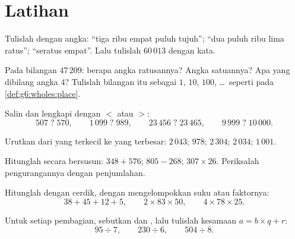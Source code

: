 \section{Latihan}

\begin{exercise}[$\star$]\label{exo:g6:wholes:1}
Tulislah dengan angka: ``tiga ribu empat puluh tujuh''; ``dua puluh
ribu lima ratus''; ``seratus empat''. Lalu tulislah $60\,013$ dengan kata.
\end{exercise}

\begin{exercise}[$\star$]\label{exo:g6:wholes:2}
Pada bilangan $47\,209$: berapa angka ratusannya? Angka satuannya?
Apa yang dibilang angka $4$? Tulislah bilangan itu sebagai 
 $1$, $10$, $100$, \dots\ seperti pada
\cref{def:g6:wholes:place}.
\end{exercise}

\begin{exercise}[$\star$]\label{exo:g6:wholes:3}
Salin dan lengkapi dengan $<$ atau $>$:
\[
507 \;?\; 570, \qquad
1\,099 \;?\; 989, \qquad
23\,456 \;?\; 23\,465, \qquad
9\,999 \;?\; 10\,000 .
\]
\end{exercise}

\begin{exercise}[$\star$]\label{exo:g6:wholes:4}
Urutkan dari yang terkecil ke yang terbesar: $2\,043$; $978$; $2\,304$; $2\,034$;
$1\,001$.
\end{exercise}

\begin{exercise}[$\star$]\label{exo:g6:wholes:5}
Hitunglah secara bersusun: $348 + 576$; \quad $805 - 268$; \quad
$307 \times 26$. Periksalah pengurangannya dengan penjumlahan.
\end{exercise}

\begin{exercise}[$\star$]\label{exo:g6:wholes:6}
Hitunglah dengan cerdik, dengan mengelompokkan suku atau faktornya:
\[
38 + 45 + 12 + 5, \qquad
2 \times 83 \times 50, \qquad
4 \times 78 \times 25 .
\]
\end{exercise}

\begin{exercise}[$\star$]\label{exo:g6:wholes:7}
Untuk setiap pembagian, sebutkan  dan , lalu
tulislah kesamaan $a = b \times q + r$:
\[
95 \div 7, \qquad
230 \div 6, \qquad
504 \div 8 .
\]
\end{exercise}

